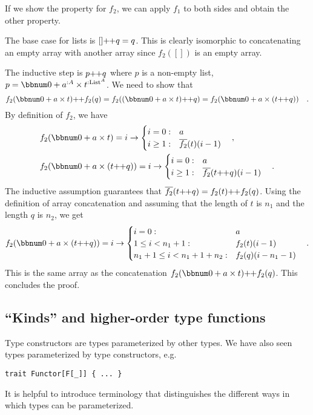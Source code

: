 If we show the property for $f_{2}$, we can apply $f_{1}$ to both
sides and obtain the other property.

The base case for lists is $[]\negmedspace+\negthickspace+q=q$. This
is clearly isomorphic to concatenating an empty array with another
array since $f_{2}([])$ is an empty array. 

The inductive step is $p\negmedspace+\negthickspace+q$ where $p$
is a non-empty list, $p=\bbnum 0+a^{:A}\times t^{:\text{List}^{A}}$.
We need to show that
\[
f_{2}(\bbnum 0+a\times t)\negmedspace+\negthickspace+f_{2}(q)=f_{2}((\bbnum 0+a\times t)\negmedspace+\negthickspace+q)=f_{2}(\bbnum 0+a\times(t\negmedspace+\negthickspace+q))\quad.
\]
By definition of $f_{2}$, we have
\begin{align*}
 & f_{2}(\bbnum 0+a\times t)=i\rightarrow\begin{cases}
i=0: & a\\
i\geq1: & \overline{f_{2}}(t)(i-1)
\end{cases}\quad,\\
 & f_{2}(\bbnum 0+a\times(t\negmedspace+\negthickspace+q))=i\rightarrow\begin{cases}
i=0: & a\\
i\geq1: & \overline{f_{2}}(t\negmedspace+\negthickspace+q)(i-1)
\end{cases}\quad.
\end{align*}
The inductive assumption guarantees that $\overline{f_{2}}(t\negmedspace+\negthickspace+q)=f_{2}(t)\negmedspace+\negthickspace+f_{2}(q)$.
Using the definition of array concatenation and assuming that the
length of $t$ is $n_{1}$ and the length $q$ is $n_{2}$, we get
\[
f_{2}(\bbnum 0+a\times(t\negmedspace+\negthickspace+q))=i\rightarrow\begin{cases}
i=0: & a\\
1\leq i<n_{1}+1: & f_{2}(t)(i-1)\\
n_{1}+1\leq i<n_{1}+1+n_{2}: & f_{2}(q)(i-n_{1}-1)
\end{cases}\quad.
\]
This is the same array as the concatenation $f_{2}(\bbnum 0+a\times t)\negmedspace+\negthickspace+f_{2}(q)$.
This concludes the proof.

\subsection{``Kinds'' and higher-order type functions}

Type constructors are types parameterized by other types. We have
also seen types parameterized by type constructors, e.g.
\begin{lstlisting}
trait Functor[F[_]] { ... }
\end{lstlisting}
It is helpful to introduce terminology that distinguishes the different
ways in which types can be parameterized.

